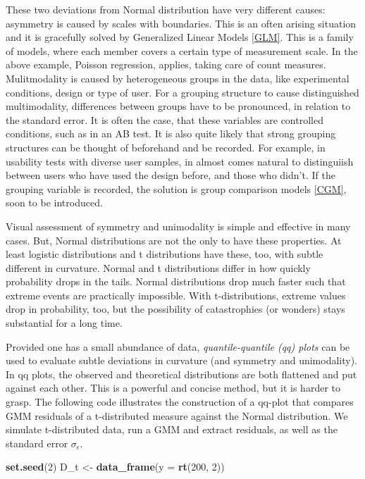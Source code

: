 \documentclass[]{svmono}
\newenvironment{Shaded}{\begin{snugshade}}{\end{snugshade}}
\newcommand{\KeywordTok}[1]{\textcolor[rgb]{0.13,0.29,0.53}{\textbf{#1}}}
\newcommand{\DataTypeTok}[1]{\textcolor[rgb]{0.13,0.29,0.53}{#1}}
\newcommand{\DecValTok}[1]{\textcolor[rgb]{0.00,0.00,0.81}{#1}}
\newcommand{\StringTok}[1]{\textcolor[rgb]{0.31,0.60,0.02}{#1}}
\newcommand{\NormalTok}[1]{#1}
\theoremstyle{definition}
\theoremstyle{definition}
\theoremstyle{definition}
\theoremstyle{remark}
\begin{document}
These two deviations from Normal distribution have very different
causes: asymmetry is caused by scales with boundaries. This is an often
arising situation and it is gracefully solved by Generalized Linear
Models \ref{GLM}. This is a family of models, where each member covers a
certain type of measurement scale. In the above example, Poisson
regression, applies, taking care of count measures. Mulitmodality is
caused by heterogeneous groups in the data, like experimental
conditions, design or type of user. For a grouping structure to cause
distinguished multimodality, differences between groups have to be
pronounced, in relation to the standard error. It is often the case,
that these variables are controlled conditions, such as in an AB test.
It is also quite likely that strong grouping structures can be thought
of beforehand and be recorded. For example, in usability tests with
diverse user samples, in almost comes natural to distinguiish between
users who have used the design before, and those who didn't. If the
grouping variable is recorded, the solution is group comparison models
\ref{CGM}, soon to be introduced.

Visual assessment of symmetry and unimodality is simple and effective in
many cases. But, Normal distributions are not the only to have these
properties. At least logistic distributions and t distributions have
these, too, with subtle different in curvature. Normal and t
distributions differ in how quickly probability drops in the tails.
Normal distributions drop much faster such that extreme events are
practically impossible. With t-distributions, extreme values drop in
probability, too, but the possibility of catastrophies (or wonders)
stays substantial for a long time.

Provided one has a small abundance of data, \emph{quantile-quantile (qq)
plots} can be used to evaluate subtle deviations in curvature (and
symmetry and unimodality). In qq plots, the observed and theoretical
distributions are both flattened and put against each other. This is a
powerful and concise method, but it is harder to grasp. The following
code illustrates the construction of a qq-plot that compares GMM
residuals of a t-distributed measure against the Normal distribution. We
simulate t-distributed data, run a GMM and extract residuals, as well as
the standard error \(\sigma_\epsilon\).

\begin{Shaded}
\begin{Highlighting}[]
\KeywordTok{set.seed}\NormalTok{(}\DecValTok{2}\NormalTok{)}
\NormalTok{D_t <-}\StringTok{ }\KeywordTok{data_frame}\NormalTok{(}\DataTypeTok{y =} \KeywordTok{rt}\NormalTok{(}\DecValTok{200}\NormalTok{, }\DecValTok{2}\NormalTok{))}
\end{Highlighting}
\end{Shaded}
\end{document}
